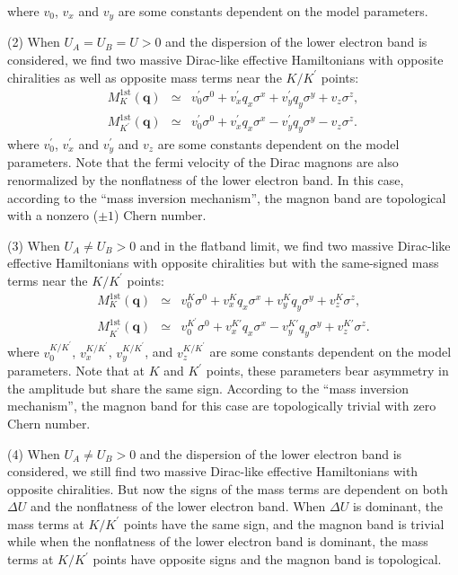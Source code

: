 \documentclass[amsmath,superscriptaddress,showpacs,aps,prl,twocolumn]{revtex4-1}
\begin{document}
where $v_0$, $v_x$ and $v_y$ are some constants dependent on the model parameters.
\par (2) When $U_A=U_B=U>0$ and the dispersion of the lower electron band is considered, we find two massive Dirac-like effective Hamiltonians with opposite chiralities as well as opposite mass terms near the $K/K^\prime$ points:
\begin{eqnarray*}
M^{\text{1st}}_K(\mathbf{q})          &\simeq& v_0^\prime\sigma^0+v_x^\prime q_x\sigma^x+v_y^\prime q_y\sigma^y+v_z\sigma^z, \\
M^{\text{1st}}_{K^\prime}(\mathbf{q}) &\simeq& v_0^\prime\sigma^0+v_x^\prime q_x\sigma^x-v_y^\prime q_y\sigma^y-v_z\sigma^z.
\end{eqnarray*}
where $v_0^\prime$, $v_x^\prime$ and $v_y^\prime$ and $v_z$ are some constants dependent on the model parameters. Note that the fermi velocity of the Dirac magnons are also renormalized by the nonflatness of the lower electron band. In this case, according to the ``mass inversion mechanism'', the magnon band are topological with a nonzero ($\pm1$) Chern number.
\par (3) When $U_A\ne U_B>0$ and in the flatband limit, we find two massive Dirac-like effective Hamiltonians with opposite chiralities but with the same-signed mass terms near the $K/K^\prime$ points:
\begin{eqnarray*}
M^{\text{1st}}_K(\mathbf{q})          &\simeq& v_0^K\sigma^0+v_x^K q_x\sigma^x+v_y^K q_y\sigma^y+v^K_z\sigma^z, \\
M^{\text{1st}}_{K^\prime}(\mathbf{q}) &\simeq& v_0^{K^\prime}\sigma^0+v_x^{K\prime} q_x\sigma^x-v_y^{K\prime} q_y\sigma^y+v_z^{K\prime}\sigma^z.
\end{eqnarray*}
where $v_0^{K/K^\prime}$, $v_x^{K/K^\prime}$, $v_y^{K/K^\prime}$, and $v_z^{K/K^\prime}$ are some constants dependent on the model parameters. Note that at $K$ and $K^\prime$ points, these parameters bear asymmetry in the amplitude but share the same sign. According to the ``mass inversion mechanism'', the magnon band for this case are topologically trivial with zero Chern number.
\par (4) When $U_A\ne U_B>0$ and the dispersion of the lower electron band is considered, we still find two massive Dirac-like effective Hamiltonians with opposite chiralities. But now the signs of the mass terms are dependent on both $\Delta U$ and the nonflatness of the lower electron band. When $\Delta U$ is dominant, the mass terms at $K/K^\prime$ points have the same sign, and the magnon band is trivial while when the nonflatness of the lower electron band is dominant, the mass terms at $K/K^\prime$ points have opposite signs and the magnon band is topological.
\end{document}
